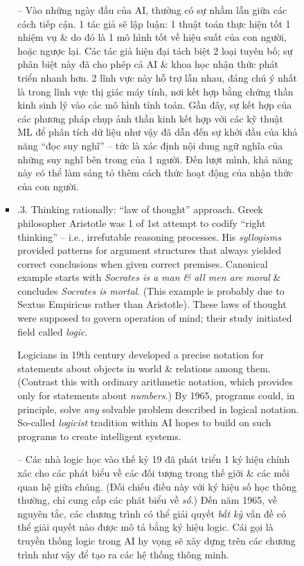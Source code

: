 \documentclass{article}
\begin{document}
\begin{itemize}
\begin{itemize}
\begin{itemize}
\begin{itemize}
				-- Vào những ngày đầu của AI, thường có sự nhầm lẫn giữa các cách tiếp cận. 1 tác giả sẽ lập luận: 1 thuật toán thực hiện tốt 1 nhiệm vụ \& do đó là 1 mô hình tốt về hiệu suất của con người, hoặc ngược lại. Các tác giả hiện đại tách biệt 2 loại tuyên bố; sự phân biệt này đã cho phép cả AI \& khoa học nhận thức phát triển nhanh hơn. 2 lĩnh vực này hỗ trợ lẫn nhau, đáng chú ý nhất là trong lĩnh vực thị giác máy tính, nơi kết hợp bằng chứng thần kinh sinh lý vào các mô hình tính toán. Gần đây, sự kết hợp của các phương pháp chụp ảnh thần kinh kết hợp với các kỹ thuật ML để phân tích dữ liệu như vậy đã dẫn đến sự khởi đầu của khả năng ``đọc suy nghĩ'' -- tức là xác định nội dung ngữ nghĩa của những suy nghĩ bên trong của 1 người. Đến lượt mình, khả năng này có thể làm sáng tỏ thêm cách thức hoạt động của nhận thức của con người.
				\item {.3. Thinking rationally: ``law of thought'' approach.} Greek philosopher {\sc Aristotle} was 1 of 1st attempt to codify ``right thinking'' -- i.e., irrefutable reasoning processes. His {\it syllogisms} provided patterns for argument structures that always yielded correct conclusions when given correct premises. Canonical example starts with {\it Socrates is a man \& all men are moral} \& concludes {\it Socrates is mortal}. (This example is probably due to {\sc Sextus Empiricus} rather than {\sc Aristotle}). These laws of thought were supposed to govern operation of mind; their study initiated field called {\it logic}.

				Logicians in 19th century developed a precise notation for statements about objects in world \& relations among them. (Contrast this with ordinary arithmetic notation, which provides only for statements about {\it numbers}.) By 1965, programs could, in principle, solve {\it any} solvable problem described in logical notation. So-called {\it logicist} tradition within AI hopes to build on such programs to create intelligent systems.

				-- Các nhà logic học vào thế kỷ 19 đã phát triển 1 ký hiệu chính xác cho các phát biểu về các đối tượng trong thế giới \& các mối quan hệ giữa chúng. (Đối chiếu điều này với ký hiệu số học thông thường, chỉ cung cấp các phát biểu về {\it số}.) Đến năm 1965, về nguyên tắc, các chương trình có thể giải quyết {\it bất kỳ} vấn đề có thể giải quyết nào được mô tả bằng ký hiệu logic. Cái gọi là truyền thống logic trong AI hy vọng sẽ xây dựng trên các chương trình như vậy để tạo ra các hệ thống thông minh.


\end{itemize}
\end{itemize}
\end{itemize}
\end{itemize}
\end{document}

